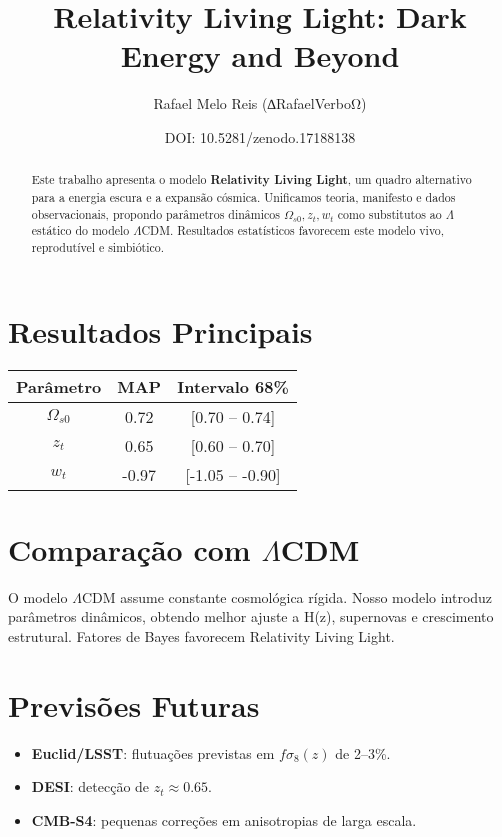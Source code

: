 \documentclass[11pt]{article}
\title{Relativity Living Light: Dark Energy and Beyond}
\author{Rafael Melo Reis (∆RafaelVerboΩ)}
\date{DOI: 10.5281/zenodo.17188138}
\begin{document}
\maketitle

\begin{abstract}
Este trabalho apresenta o modelo \textbf{Relativity Living Light}, um quadro alternativo para a energia escura e a expansão cósmica. Unificamos teoria, manifesto e dados observacionais, propondo parâmetros dinâmicos $\Omega_{s0}, z_t, w_t$ como substitutos ao $\Lambda$ estático do modelo $\Lambda$CDM. Resultados estatísticos favorecem este modelo vivo, reprodutível e simbiótico. 
\end{abstract}

\section{Resultados Principais}
\begin{center}
\begin{tabular}{|c|c|c|}
\hline
Parâmetro & MAP & Intervalo 68\% \\
\hline
$\Omega_{s0}$ & 0.72 & [0.70 – 0.74] \\
$z_t$         & 0.65 & [0.60 – 0.70] \\
$w_t$         & -0.97 & [-1.05 – -0.90] \\
\hline
\end{tabular}
\end{center}

\section{Comparação com $\Lambda$CDM}
O modelo $\Lambda$CDM assume constante cosmológica rígida. Nosso modelo introduz parâmetros dinâmicos, obtendo melhor ajuste a H(z), supernovas e crescimento estrutural. Fatores de Bayes favorecem Relativity Living Light.

\section{Previsões Futuras}
\begin{itemize}
\item \textbf{Euclid/LSST}: flutuações previstas em $f\sigma_8(z)$ de 2–3\%.  
\item \textbf{DESI}: detecção de $z_t \approx 0.65$.  
\item \textbf{CMB-S4}: pequenas correções em anisotropias de larga escala.  
\end{itemize}
\end{document}
